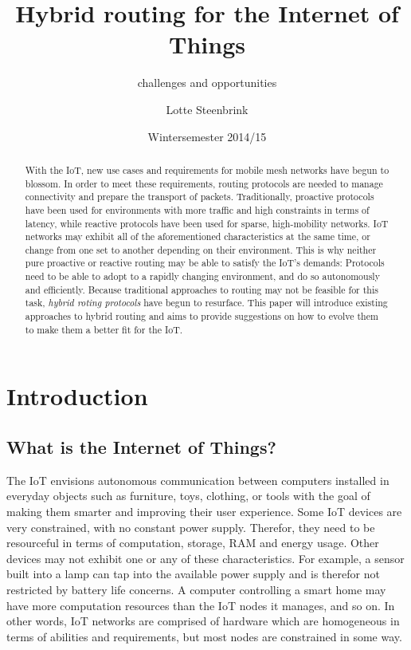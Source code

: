 \documentclass[a4paper,10pt]{scrartcl}
\begin{document}
\title{Hybrid routing for the Internet of Things}
\subtitle{challenges and opportunities}
\author{Lotte Steenbrink}
\date{Wintersemester 2014/15}
\maketitle

\begin{abstract}
With the \gls{IoT}, new use cases and requirements for mobile mesh networks have begun to blossom. In order to meet these requirements, routing protocols are needed to manage connectivity and prepare the transport of packets. Traditionally, proactive protocols have been used for environments with more traffic and high constraints in terms of latency, while reactive protocols have been used for sparse, high-mobility networks. IoT networks may exhibit all of the aforementioned characteristics at the same time, or change from one set to another depending on their environment. This is why neither pure proactive or reactive routing may be able to satisfy the IoT's demands: Protocols need to be able to adopt to a rapidly changing environment, and do so autonomously and efficiently.
Because traditional approaches to routing may not be feasible for this task, \emph{hybrid roting protocols} have begun to resurface. This paper will introduce existing approaches to hybrid routing and aims to provide suggestions on how to evolve them to make them a better fit for the IoT.

\end{abstract}

\section{Introduction}
\label{sec:Intro}

\subsection{What is the Internet of Things?}
\label{subsec:IoT}
The \gls{IoT} envisions autonomous communication between computers installed in everyday objects such as furniture, toys, clothing, or tools with the goal of making them smarter and improving their user experience. Some IoT devices are very constrained, with no constant power supply. Therefor, they need to be resourceful in terms of computation, storage, RAM and energy usage. Other devices may not exhibit one or any of these characteristics. For example, a sensor built into a lamp can tap into the available power supply and is therefor not restricted by battery life concerns. A computer controlling a smart home may have more computation resources than the IoT nodes it manages, and so on. In other words, IoT networks are comprised of hardware which are homogeneous in terms of abilities and requirements, but most nodes are constrained in some way.\\
\end{document}
